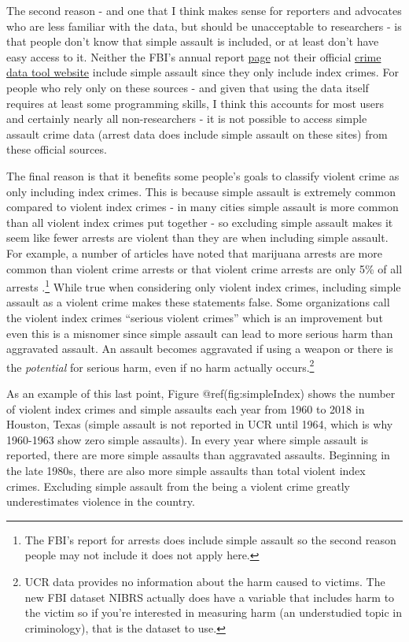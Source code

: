 \documentclass[
  12pt,
  openany]{book}
\begin{document}
The second reason - and one that I think makes sense for reporters and advocates who are less familiar with the data, but should be unacceptable to researchers - is that people don't know that simple assault is included, or at least don't have easy access to it. Neither the FBI's annual report \href{https://ucr.fbi.gov/crime-in-the-u.s/2019/crime-in-the-u.s.-2019/home}{page} not their official \href{https://crime-data-explorer.fr.cloud.gov/}{crime data tool website} include simple assault since they only include index crimes. For people who rely only on these sources - and given that using the data itself requires at least some programming skills, I think this accounts for most users and certainly nearly all non-researchers - it is not possible to access simple assault crime data (arrest data does include simple assault on these sites) from these official sources.

The final reason is that it benefits some people's goals to classify violent crime as only including index crimes. This is because simple assault is extremely common compared to violent index crimes - in many cities simple assault is more common than all violent index crimes put together - so excluding simple assault makes it seem like fewer arrests are violent than they are when including simple assault. For example, a number of articles have noted that marijuana arrests are more common than violent crime arrests \citep{ingraham2016, kertscher2019, devito2020, earlenbaugh2020, aclu2020} or that violent crime arrests are only 5\% of all arrests \citep{neusteter2019every, speri2019}.\footnote{The FBI's report for arrests does include simple assault so the second reason people may not include it does not apply here.} While true when considering only violent index crimes, including simple assault as a violent crime makes these statements false. Some organizations call the violent index crimes ``serious violent crimes'' which is an improvement but even this is a misnomer since simple assault can lead to more serious harm than aggravated assault. An assault becomes aggravated if using a weapon or there is the \emph{potential} for serious harm, even if no harm actually occurs.\footnote{UCR data provides no information about the harm caused to victims. The new FBI dataset NIBRS actually does have a variable that includes harm to the victim so if you're interested in measuring harm (an understudied topic in criminology), that is the dataset to use.}

As an example of this last point, Figure @ref(fig:simpleIndex) shows the number of violent index crimes and simple assaults each year from 1960 to 2018 in Houston, Texas (simple assault is not reported in UCR until 1964, which is why 1960-1963 show zero simple assaults). In every year where simple assault is reported, there are more simple assaults than aggravated assaults. Beginning in the late 1980s, there are also more simple assaults than total violent index crimes. Excluding simple assault from the being a violent crime greatly underestimates violence in the country.
\end{document}
